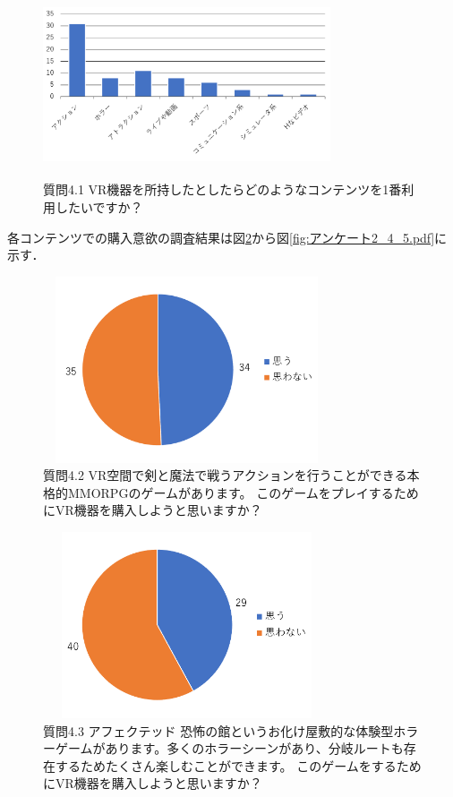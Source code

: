 \documentclass[12pt,a4j]{ltjsarticle}
\begin{document}
\begin{figure}[h]
\begin{center}
 \includegraphics[clip,width=85mm,height=55mm]{
 アンケート2_4_1.pdf}
\end{center}
 \caption{質問4.1 VR機器を所持したとしたらどのようなコンテンツを1番利用したいですか？}
 \label{fig:アンケート2_4_1.pdf}
\end{figure}

各コンテンツでの購入意欲の調査結果は図\ref{fig:アンケート2_4_2.pdf}から図\ref{fig:アンケート2_4_5.pdf}に示す．

\begin{figure}[h]
\begin{center}
 \includegraphics[clip,width=85mm,height=55mm]{
 アンケート2_4_2.pdf}
\end{center}
 \caption{質問4.2 VR空間で剣と魔法で戦うアクションを行うことができる本格的MMORPGのゲームがあります。
このゲームをプレイするためにVR機器を購入しようと思いますか？}
 \label{fig:アンケート2_4_2.pdf}
\end{figure}

\begin{figure}[h]
\begin{center}
 \includegraphics[clip,width=85mm,height=55mm]{
 アンケート2_4_3.pdf}
\end{center}
 \caption{質問4.3 アフェクテッド 恐怖の館というお化け屋敷的な体験型ホラーゲームがあります。多くのホラーシーンがあり、分岐ルートも存在するためたくさん楽しむことができます。
このゲームをするためにVR機器を購入しようと思いますか？}
 \label{fig:アンケート2_4_3.pdf}
\end{figure}
\end{document}
